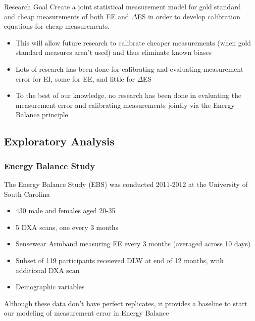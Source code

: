 \documentclass[handout]{beamer}\usepackage[]{graphicx}\usepackage[]{color}
\begin{document}
\begin{frame}

\begin{block}{Research Goal}
Create a joint statistical measurement model for gold standard and cheap measurements of both EE and $\Delta$ES in order to develop calibration equations for cheap measurements.\\
\end{block}

\vspace{0.4cm}

\begin{itemize}
\item
This will allow future research to calibrate cheaper measurements (when gold standard measures aren't used) and thus eliminate known biases
\item
Lots of research has been done for calibrating and evaluating measurement error for EI, some for EE, and little for $\Delta$ES
\item
To the best of our knowledge, no research has been done in evaluating the measurement error and calibrating measurements jointly via the Energy Balance principle
\end{itemize}


\end{frame}


\subsection{Exploratory Analysis}

\begin{frame}
\frametitle{Energy Balance Study}
The Energy Balance Study (EBS) was conducted 2011-2012 at the University of South Carolina
\begin{itemize}
\item
430 male and females aged 20-35 \\
\item
5 DXA scans, one every 3 months
\item
Sensewear Armband measuring EE every 3 months (averaged across 10 days)
\item
Subset of 119 participants receieved DLW at end of 12 months, with additional DXA scan
\item
Demographic variables
\end{itemize}

\vspace{0.2cm}

Although these data don't have perfect replicates, it provides a baseline to start our modeling of measurement error in Energy Balance


\end{frame}
\end{document}
